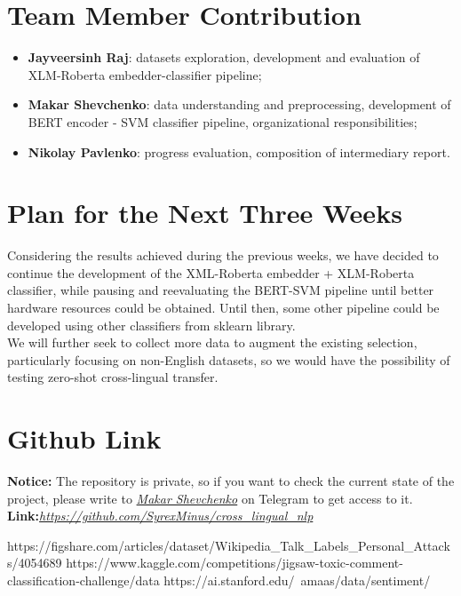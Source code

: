 \documentclass[]{article}
\begin{document}
	\section{Team Member Contribution}
	
	\begin{itemize}
		\item \textbf{Jayveersinh Raj}: datasets exploration, development and evaluation of XLM-Roberta embedder-classifier pipeline;
		\item \textbf{Makar Shevchenko}: data understanding and preprocessing, development of BERT encoder - SVM classifier pipeline, organizational responsibilities;
		\item \textbf{Nikolay Pavlenko}: progress evaluation, composition of intermediary report. 
	\end{itemize}

	\section{Plan for the Next Three Weeks}
	
	Considering the results achieved during the previous weeks, we have decided to continue the development of the XML-Roberta embedder + XLM-Roberta classifier, while pausing and reevaluating the BERT-SVM pipeline until better hardware resources could be obtained. Until then, some other pipeline could be developed using other classifiers from sklearn library. \\
	We will further seek to collect more data to augment the existing selection, particularly focusing on non-English datasets, so we would have the possibility of testing zero-shot cross-lingual transfer.
	
	\section{Github Link}
	\textbf{Notice:} The repository is private, so if you want to check the current state of the project, please write to \href{https://t.me/syrexminus}{\emph{Makar Shevchenko}} on Telegram to get access to it.
	\textbf{Link:}\href{https://github.com/SyrexMinus/cross\_lingual\_nlp}{\emph{https://github.com/SyrexMinus/cross\_lingual\_nlp}}
	
	\begin{thebibliography}{9}
		 https://figshare.com/articles/dataset/Wikipedia\_Talk\_Labels\_Personal\_Attacks/4054689
		https://www.kaggle.com/competitions/jigsaw-toxic-comment-classification-challenge/data
		https://ai.stanford.edu/~amaas/data/sentiment/
	\end{thebibliography}
	
\end{document}
